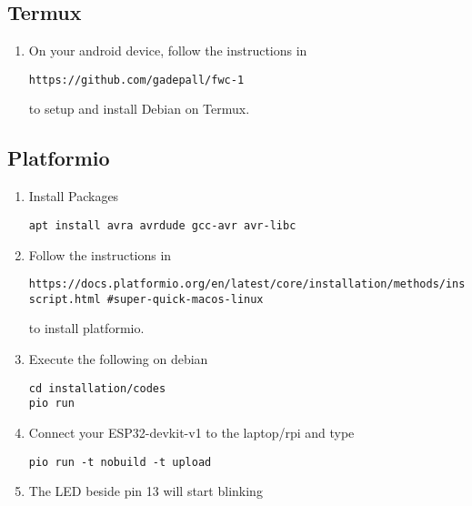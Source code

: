 	\subsection{Termux}
\begin{enumerate}[label=\arabic*.,ref=\theenumi]
	\item On your android device, follow the instructions in 
%
\begin{lstlisting}
https://github.com/gadepall/fwc-1
\end{lstlisting}
to setup and install Debian on Termux.
\iffalse
\item Install Termux from apkpure
\item Install basic packages on termux 
\begin{lstlisting}
#Give termux access to your  user directory in android
termux-setup-storage

#Upgrade packages
apt update && apt upgrade
apt install build-essential openssh

#Mandatory packages
apt install curl git wget subversion proot proot-distro python  nmap neovim ranger
#------------------End Install Termux----------------------------
\end{lstlisting}
\item Install debian on termux 
\begin{lstlisting}
proot-distro install debian
proot-distro login debian
\end{lstlisting}
\fi
\end{enumerate}
\subsection{Platformio }
\begin{enumerate}[label=\arabic*.,ref=\theenumi]
	\item Install Packages
\begin{lstlisting}
apt install avra avrdude gcc-avr avr-libc
\end{lstlisting}
\item Follow the instructions in 
\begin{lstlisting}
https://docs.platformio.org/en/latest/core/installation/methods/installer-script.html #super-quick-macos-linux
\end{lstlisting}
to install platformio.
\item Execute the following on debian
\begin{lstlisting}
cd installation/codes
pio run
\end{lstlisting}
\item Connect your ESP32-devkit-v1 to the  laptop/rpi and type
\begin{lstlisting}
pio run -t nobuild -t upload
\end{lstlisting}
\item The LED beside pin 13 will start
blinking

\end{enumerate}
